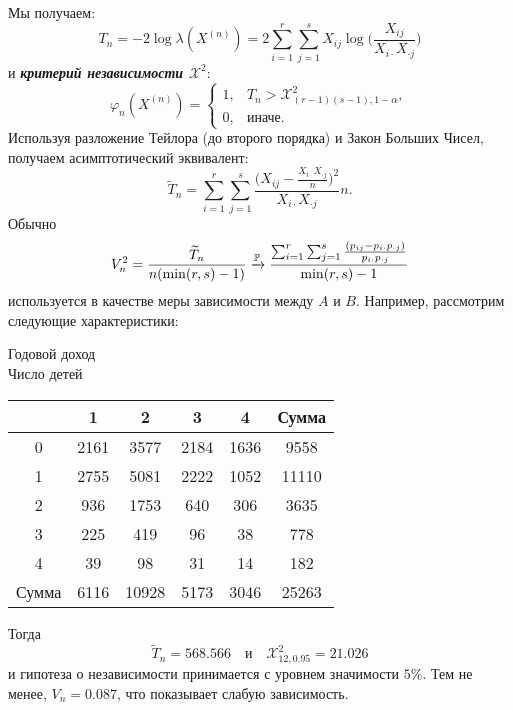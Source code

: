 \begin{exmp}
    Мы получаем:
    \[T_n = -2 \log \lambda(X^{(n)}) = 2 \sum_{i=1}^r  \sum_{j=1}^s X_{ij} \log \Big( \frac{X_{ij}}{X_{i \cdot} X_{\cdot j}} \Big)  \]
    и \textbf{\textit{критерий независимости $\mathcal{X}^2$}}:
   	\[ \varphi_n(X^{(n)}) =
   	\left \{
   	\begin{array}{cl}
   	1, & T_n > \mathcal{X}_{(r-1)(s-1), 1-\alpha}^2, \\
   	0, & \text{иначе}. 
   	\end{array}
   	\right.
   	\]
   	Используя разложение Тейлора (до второго порядка) и Закон Больших Чисел, получаем асимптотический эквивалент:
   	\[\widetilde{T}_n = \sum_{i=1}^{r} \sum_{j=1}^s \frac{\Big(X_{ij} -\frac{X_{i \cdot} X_{\cdot j}}{n}\Big)^2}{X_{i \cdot} X_{\cdot j}} n.  \]
   	Обычно
   	\[ V_n^2 = \frac{\widetilde{T}_n}{n (\min(r, s) - 1)} \xrightarrow{\mathbb{P}} \frac{\sum_{i=1}^{r} \sum_{j=1}^s \frac{(p_{ij} - p_{i \cdot}p_{\cdot j} )}{p_{i \cdot}p_{\cdot j}}}{\min(r, s) - 1} \]
   	используется в качестве меры зависимости между $A$ и $B$. Например, рассмотрим следующие характеристики:
	\begin{center}
		\qquad\qquad\qquad\qquad  Годовой доход \\
		Число детей
		\begin{tabular}{| c | c  c  c  c | c |}
			\hline
			& 1 & 2 & 3 & 4 & Сумма \\
			\hline
			0 & 2161 & 3577 & 2184 & 1636 & 9558 \\
			1 & 2755 & 5081 & 2222 & 1052 & 11110 \\
			2 & 936 & 1753 & 640 & 306 & 3635 \\
			3 & 225 & 419 & 96 & 38 & 778 \\
			4 & 39 & 98 & 31 & 14 & 182 \\
			\hline
			Сумма & 6116 & 10928 & 5173 & 3046 & 25263 \\
			\hline
		\end{tabular}
	\end{center}
   	Тогда 
   	\[ \widetilde{T}_n  = 568.566 \quad \text{и} \quad \mathcal{X}_{12, 0.95}^2 = 21.026 \]
   	и гипотеза о независимости принимается с уровнем значимости $5\%$. Тем не менее, $V_n = 0.087$, что показывает слабую зависимость.
\end{exmp}

\raggedbottom
\pagebreak

